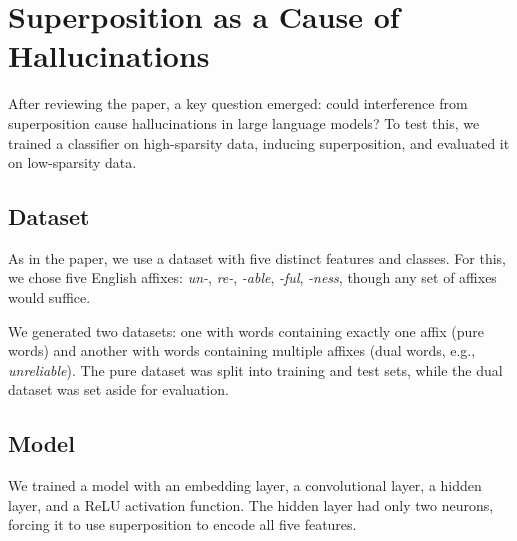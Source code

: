 \section{Superposition as a Cause of Hallucinations}
\label{sec:superposition_as_a_cause_of_hallucinations}

After reviewing the paper, a key question emerged: could interference from superposition cause hallucinations in large language models?
To test this, we trained a classifier on high-sparsity data, inducing superposition, and evaluated it on low-sparsity data.

\subsection{Dataset}
As in the paper, we use a dataset with five distinct features and classes.
For this, we chose five English affixes: \textit{un-}, \textit{re-}, \textit{-able}, \textit{-ful}, \textit{-ness}, though any set of affixes would suffice.

We generated two datasets: one with words containing exactly one affix (pure words) and another with words containing multiple affixes (dual words, e.g., \textit{unreliable}).
The pure dataset was split into training and test sets, while the dual dataset was set aside for evaluation.

\subsection{Model}
We trained a model with an embedding layer, a convolutional layer, a hidden layer, and a ReLU activation function.
The hidden layer had only two neurons, forcing it to use superposition to encode all five features.

